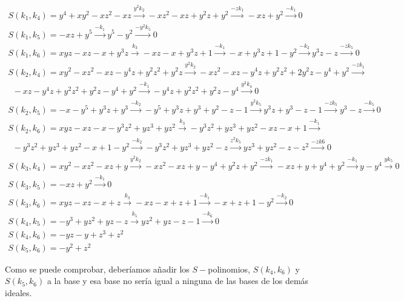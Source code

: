 \documentclass{article}
\begin{document}
\begin{equation}
    \begin{array}{l}
        S(k_1, k_4) = y^4 +xy^2 -xz^2-xz \xrightarrow{y^2 k_2} -xz^2 -xz + y^2z +y^2 \xrightarrow{-zk_1} -xz +y^2 \xrightarrow{-k_1} 0 \\        
        S(k_1, k_5) = -xz +y^5 \xrightarrow{-k_1} y^5 - y^2 \xrightarrow{-y^2k_5} 0\\        
        S(k_1, k_6) = xyz - xz - x + y^3z \xrightarrow{k_3} -xz - x + y^3z + 1 \xrightarrow{-k_1} -x + y^3z + 1 -y^2 \xrightarrow{-k_2} y^3z - z \xrightarrow{-z k_5} 0 \\        
        S(k_2, k_4) = xy^2 -xz^2 -xz -y^4z + y^2z^2 +y^2z \xrightarrow{y^2 k_2} -xz^2 -xz -y^4z +y^2z^2 + 2y^2z -y^4+y^2 \xrightarrow{-z k_1}\\
        \, \, \, -xz - y^4z + y^2z^2 + y^2z - y^4+y^2 \xrightarrow{-k_1} -y^4z + y^2z^2 +y^2z - y^4 \xrightarrow{y^2 k_4} 0 \\        
        S(k_2, k_5) = -x -y^5 + y^3z +y^3 \xrightarrow{-k_2} -y^5+y^3z+y^3+y^2-z-1 \xrightarrow{y^2 k_5} y^3z +y^3 -z -1 \xrightarrow{-zk_5} y^3 -z \xrightarrow{-k_5} 0 \\        
        S(k_2, k_6) = xyz -xz - x -y^3z^2+yz^3+yz^2 \xrightarrow{k_3} -y^3z^2 + yz^3+yz^2-xz-x+1\xrightarrow{-k_1} \\ \, \, \, -y^3z^2+yz^3+yz^2-x+1-y^2\xrightarrow{-k_2} -y^3z^2+yz^3+yz^2-z\xrightarrow{z^2k_5} yz^3+yz^2-z-z^2\xrightarrow{-zk6} 0\\
        S(k_3, k_4) = xy^2 -xz^2 - xz +y \xrightarrow{y^2 k_2} -xz^2 - xz + y -y^4+y^2z + y^2 \xrightarrow{-z k_1} -xz+y+y^4+y^2 \xrightarrow{-k_1} y-y^4 \xrightarrow{y k_5} 0 \\        
        S(k_3, k_5) = -xz +y^2 \xrightarrow{-k_1} 0 \\        
        S(k_3, k_6) = xyz -xz-x+z \xrightarrow{k_3} -xz-x+z+1 \xrightarrow{-k_1} -x+z+1-y^2 \xrightarrow{-k_2} 0\\        
        S(k_4, k_5) = -y^3+yz^2+yz-z \xrightarrow{k_5} yz^2+yz-z-1 \xrightarrow{-k_6} 0 \\        
        S(k_4, k_6) = -yz-y+z^3+z^2 \\        
        S(k_5, k_6) = -y^2+z^2        
    \end{array}
\end{equation}

Como se puede comprobar, deberíamos añadir los $S-$polinomios,
$S(k_4,k_6)$ y $S(k_5, k_6)$ a la base y esa base no sería igual a
ninguna de las bases de los demás ideales. ~
\end{document}

